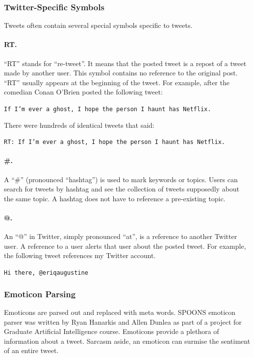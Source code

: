 \documentclass[12pt]{ucthesis}
\begin{document}
\subsubsection{Twitter-Specific Symbols}
\label{class-filter-twitter-symbols}
Tweets often contain several special symbols specific to tweets.

\paragraph{RT.}
\label{class-twitter-symbols-rt}
``RT'' stands for ``re-tweet''. It means that the posted tweet is a repost of
a tweet made by another user. This symbol contains no reference to the original post.
``RT'' usually appears at the beginning of the tweet. For example, after the comedian
Conan O'Brien posted the following tweet:

\begin{center}
   \texttt{If I'm ever a ghost, I hope the person I haunt has Netflix.}
\end{center}

There were hundreds of identical tweets that said:

\begin{center}
   \texttt{RT: If I'm ever a ghost, I hope the person I haunt has Netflix.}
\end{center}

\paragraph{\#.}
\label{class-twitter-symbols-hash}
A ``\#'' (pronounced ``hashtag'') is used to mark keywords or topics.
Users can search for tweets by hashtag and see the collection of tweets supposedly about the
same topic. A hashtag does not have to reference a pre-existing topic.

\paragraph{@.}
\label{class-twitter-symbols-at}
An ``@'' in Twitter, simply pronounced ``at'', is a reference to another Twitter user.
A reference to a user alerts that user about the posted tweet.
For example, the following tweet references my Twitter account.

\begin{center}
   \texttt{Hi there, @eriqaugustine}
\end{center}

\subsubsection{Emoticon Parsing}
\label{class-filter-emoticon}
Emoticons are parsed out and replaced with meta words.
SPOONS emoticon parser was written by Ryan Hanarkis and Allen Dunlea as part of a project for Graduate Artificial Intelligence course.
Emoticons provide a plethora of information about a tweet. Sarcasm aside,
an emoticon can surmise the sentiment of an entire tweet.
\end{document}
